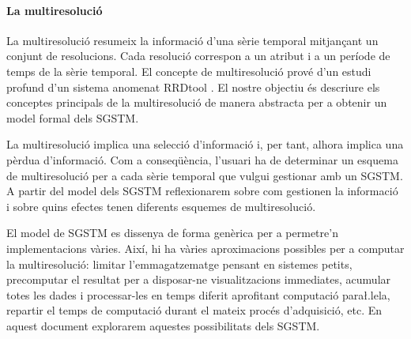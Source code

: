 



\paragraph{La multiresolució}
La multiresolució resumeix la informació d'una sèrie temporal
mitjançant un conjunt de resolucions. Cada resolució correspon a un
atribut i a un període de temps de la sèrie temporal. El concepte de
multiresolució prové d'un estudi profund d'un sistema anomenat
RRDtool \parencite{rrdtool}. El nostre objectiu és descriure els
conceptes principals de la multiresolució de manera abstracta per a
obtenir un model formal dels \gls{SGSTM}.

La multiresolució implica una selecció d'informació i, per tant,
alhora implica una pèrdua d'informació. Com a conseqüència, l'usuari
ha de determinar un esquema de multiresolució per a cada sèrie
temporal que vulgui gestionar amb un \gls{SGSTM}. A partir del model
dels \gls{SGSTM} reflexionarem sobre com gestionen la informació i
sobre quins efectes tenen diferents esquemes de multiresolució.


El model de \gls{SGSTM} es dissenya de forma genèrica per a permetre'n
implementacions vàries. Així, hi ha vàries aproximacions possibles per
a computar la multiresolució: limitar l'emmagatzematge pensant en
sistemes petits, precomputar el resultat per a disposar-ne
visualitzacions immediates, acumular totes les dades i processar-les
en temps diferit aprofitant computació para\l.lela, repartir el temps
de computació durant el mateix procés d'adquisició, etc. En aquest
document explorarem aquestes possibilitats dels \gls{SGSTM}.





